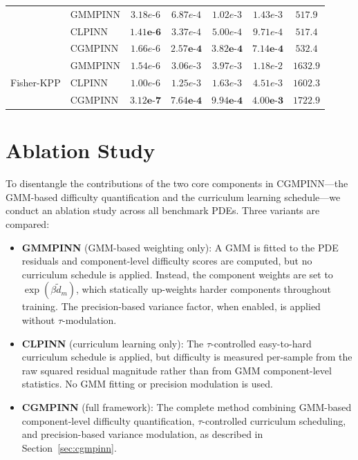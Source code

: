 \documentclass{article}
\theoremstyle{plain}
\theoremstyle{definition}
\theoremstyle{remark}
\begin{document}
\begin{table}[t]
\begin{tabular}{llccccc}
			& GMMPINN & $3.18e\text{-}6$ & $6.87e\text{-}4$ & $1.02e\text{-}3$ & $1.43e\text{-}3$ & $517.9$ \\
			& CLPINN  & $\mathbf{1.41e\text{-}6}$ & $3.37e\text{-}4$ & $5.00e\text{-}4$ & $9.71e\text{-}4$ & $517.4$ \\
			& CGMPINN & $1.66e\text{-}6$ & $\mathbf{2.57e\text{-}4}$ & $\mathbf{3.82e\text{-}4}$ & $\mathbf{7.14e\text{-}4}$ & $532.4$ \\
			\midrule
			\multirow{3}{*}{Fisher-KPP}
			& GMMPINN & $1.54e\text{-}6$ & $3.06e\text{-}3$ & $3.97e\text{-}3$ & $1.18e\text{-}2$ & $1632.9$ \\
			& CLPINN  & $1.00e\text{-}6$ & $1.25e\text{-}3$ & $1.63e\text{-}3$ & $4.51e\text{-}3$ & $1602.3$ \\
			& CGMPINN & $\mathbf{3.12e\text{-}7}$ & $\mathbf{7.64e\text{-}4}$ & $\mathbf{9.94e\text{-}4}$ & $\mathbf{4.00e\text{-}3}$ & $1722.9$ \\
			\bottomrule
	\end{tabular}
\end{table}


\section{Ablation Study}
\label{app:ablation}

To disentangle the contributions of the two core components in CGMPINN---the GMM-based difficulty quantification and the curriculum learning schedule---we conduct an ablation study across all benchmark PDEs. Three variants are compared:

\begin{itemize}
	\item \textbf{GMMPINN} (GMM-based weighting only): A GMM is fitted to the PDE residuals and component-level difficulty scores are computed, but no curriculum schedule is applied. Instead, the component weights are set to $\exp(\beta\tilde{d}_m)$, which statically up-weights harder components throughout training. The precision-based variance factor, when enabled, is applied without $\tau$-modulation.
	
	\item \textbf{CLPINN} (curriculum learning only): The $\tau$-controlled easy-to-hard curriculum schedule is applied, but difficulty is measured per-sample from the raw squared residual magnitude rather than from GMM component-level statistics. No GMM fitting or precision modulation is used.
	
	\item \textbf{CGMPINN} (full framework): The complete method combining GMM-based component-level difficulty quantification, $\tau$-controlled curriculum scheduling, and precision-based variance modulation, as described in Section~\ref{sec:cgmpinn}.
\end{itemize}
\end{document}
